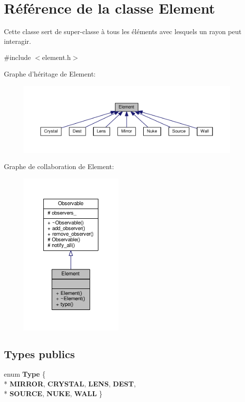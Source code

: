 \hypertarget{classElement}{\section{Référence de la classe Element}
\label{classElement}
}


Cette classe sert de super-\/classe à tous les éléments avec lesquels un rayon peut interagir.  




{\ttfamily \#include $<$element.\+h$>$}



Graphe d'héritage de Element\+:\nopagebreak
\begin{figure}[H]
\begin{center}
\leavevmode
\includegraphics[width=350pt]{d8/dd6/classElement__inherit__graph}
\end{center}
\end{figure}


Graphe de collaboration de Element\+:\nopagebreak
\begin{figure}[H]
\begin{center}
\leavevmode
\includegraphics[width=146pt]{d4/dd1/classElement__coll__graph}
\end{center}
\end{figure}
\subsection*{Types publics}
\begin{DoxyCompactItemize}
\item 
\hypertarget{classElement_a009a3be4c3a037a72e292b2464c9cbc5}{enum {\bfseries Type} \{ \\*
{\bfseries M\+I\+R\+R\+O\+R}, 
{\bfseries C\+R\+Y\+S\+T\+A\+L}, 
{\bfseries L\+E\+N\+S}, 
{\bfseries D\+E\+S\+T}, 
\\*
{\bfseries S\+O\+U\+R\+C\+E}, 
{\bfseries N\+U\+K\+E}, 
{\bfseries W\+A\+L\+L}
 \}}\label{classElement_a009a3be4c3a037a72e292b2464c9cbc5}

\end{DoxyCompactItemize}
